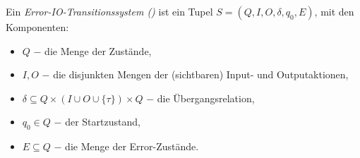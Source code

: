 \begin{Def}
  Ein \emph{Error-IO-Transitionssystem \linebreak (\EIO{})} ist
  ein Tupel $S=(Q,I,O,\delta, q_0, E)$, mit den Komponenten:
  \begin{itemize}
    \item $Q$ $-$ die Menge der Zustände,
    \item $I,O$ $-$ die disjunkten Mengen der (sichtbaren) Input- und
      Outputaktionen,
    \item $\delta\subseteq Q\times (I\cup O\cup\{\tau\})\times Q$ $-$ die
      Übergangsrelation,
    \item $q_0\in Q$ $-$ der Startzustand,
    \item $E\subseteq Q$ $-$ die Menge der Error-Zustände.
  \end{itemize}
\end{Def}


